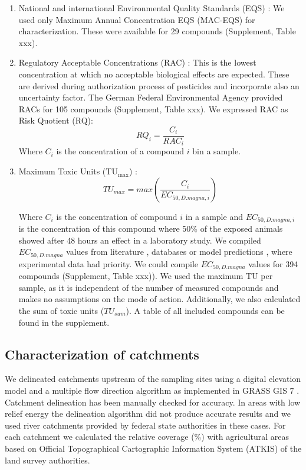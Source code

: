 \documentclass[journal=esthag,manuscript=article]{achemso}
\begin{document}
\begin{enumerate}
  \item National and international Environmental Quality Standards (EQS) \citep{ogewv_verordnung_2011,european_union_directive_2013}:
  We used only Maximum Annual Concentration EQS (MAC-EQS) for characterization.
  These were available for 29 compounds (Supplement, Table xxx).

  \item Regulatory Acceptable Concentrations (RAC) \citep{brock_linking_2010}:
  This is the lowest concentration at which no acceptable biological effects are expected. 
  These are derived during authorization process of pesticides and incorporate also an uncertainty factor.
  The German Federal Environmental Agency provided RACs for 105 compounds (Supplement, Table xxx).  
  We expressed RAC as Risk Quotient (RQ):
  \begin{equation}
  RQ_i = \frac{C_i}{RAC_i}
  \end{equation}
  Where $C_i$ is the concentration of a compound $i$ bin a sample.

  \item Maximum Toxic Units ($\mathrm{TU_{max}}$)  \citep{sprague_measurement_1970}: 
  \begin{equation}
  TU_{max} = max(\frac{C_i}{EC_{50, D.magna, i}})
  \end{equation}

  Where $C_i$ is the concentration of compound $i$ in a sample and $EC_{50, D.magna, i}$ is the concentration of this compound where 50\% of the exposed animals showed after 48 hours an effect in a laboratory study.
  We compiled $EC_{50, D.magna}$ values from literature \citep{malaj_organic_2014}, databases \citep{lewis_international_2016,u.s._epa_ecotoxicology_2015} or model predictions \citep{schuurmann_quantitative_2011}, where experimental data had priority.
  We could compile $EC_{50, D.magna}$ values for 394 compounds (Supplement, Table xxx)).
  We used the maximum TU per sample, as it is independent of the number of measured compounds and makes no assumptions on the mode of action.
  Additionally, we also calculated the sum of toxic units ($TU_{sum}$).
  A table of all included compounds can be found in the supplement.
\end{enumerate}


\subsection{Characterization of catchments}
We delineated catchments upstream of the sampling sites using a digital elevation model \citep{eea_digital_2013} and a multiple flow direction algorithm \citep{holmgren_multiple_1994} as implemented in GRASS GIS 7 \citep{neteler_grass_2012}.
Catchment delineation has been manually checked for accuracy. 
In areas with low relief energy the delineation algorithm did not produce accurate results and we used river catchments provided by federal state authorities in these cases.
For each catchment we calculated the relative coverage (\%) with agricultural areas based on Official Topographical Cartographic Information System (ATKIS) of the land survey authorities.
\end{document}
